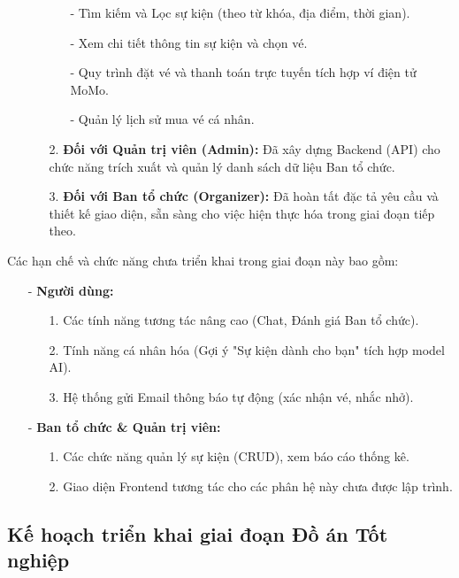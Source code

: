 \begin{itemize}
\begin{itemize}
\begin{itemize}
            \item[-] Tìm kiếm và Lọc sự kiện (theo từ khóa, địa điểm, thời gian).
            \item[-] Xem chi tiết thông tin sự kiện và chọn vé.
            \item[-] Quy trình đặt vé và thanh toán trực tuyến tích hợp ví điện tử MoMo.
            \item[-] Quản lý lịch sử mua vé cá nhân.
        \end{itemize}
        \item[2.] \textbf{Đối với Quản trị viên (Admin):} Đã xây dựng Backend (API) cho chức năng trích xuất và quản lý danh sách dữ liệu Ban tổ chức.
        \item[3.] \textbf{Đối với Ban tổ chức (Organizer):} Đã hoàn tất đặc tả yêu cầu và thiết kế giao diện, sẵn sàng cho việc hiện thực hóa trong giai đoạn tiếp theo.
    \end{itemize}
\end{itemize}
\indent \indent Các hạn chế và chức năng chưa triển khai trong giai đoạn này bao gồm:
\begin{itemize}
    \item[-] \textbf{Người dùng:}
    \begin{itemize}
        \item[1.] Các tính năng tương tác nâng cao (Chat, Đánh giá Ban tổ chức).
        \item[2.] Tính năng cá nhân hóa (Gợi ý "Sự kiện dành cho bạn" tích hợp model AI).
        \item[3.] Hệ thống gửi Email thông báo tự động (xác nhận vé, nhắc nhở).
    \end{itemize}
    \item[-] \textbf{Ban tổ chức \& Quản trị viên:}
    \begin{itemize}
        \item[1.] Các chức năng quản lý sự kiện (CRUD), xem báo cáo thống kê.
        \item[2.] Giao diện Frontend tương tác cho các phân hệ này chưa được lập trình.
    \end{itemize}
\end{itemize}

\subsection{Kế hoạch triển khai giai đoạn Đồ án Tốt nghiệp}
